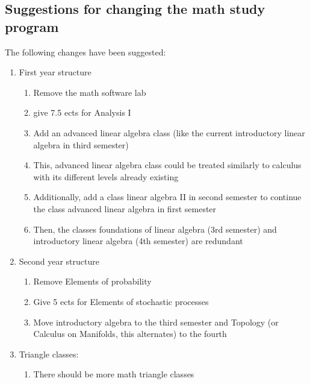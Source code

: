 \subsection{Suggestions for changing the math study program}
\label{sec-1-3}
The following changes have been suggested:
\begin{enumerate}
\item First year structure
\begin{enumerate}
\item Remove the math software lab
\item give 7.5 ects for Analysis I
\item Add an advanced linear algebra class (like the current introductory linear algebra in third semester)
\item This, advanced linear algebra class could be treated similarly to calculus with its different levels already existing
\item Additionally, add a class linear algebra II in second semester to continue the class advanced linear algebra in first semester
\item Then, the classes foundations of linear algebra (3rd semester) and introductory linear algebra (4th semester) are redundant
\end{enumerate}
\item Second year structure
\begin{enumerate}
\item Remove Elements of probability
\item Give 5 ects for Elements of stochastic processes
\item Move introductory algebra to the third semester and Topology (or Calculus on Manifolds, this alternates) to the fourth
\end{enumerate}
\item Triangle classes:
\begin{enumerate}
\item There should be more math triangle classes\\
\end{enumerate}
\end{enumerate}

